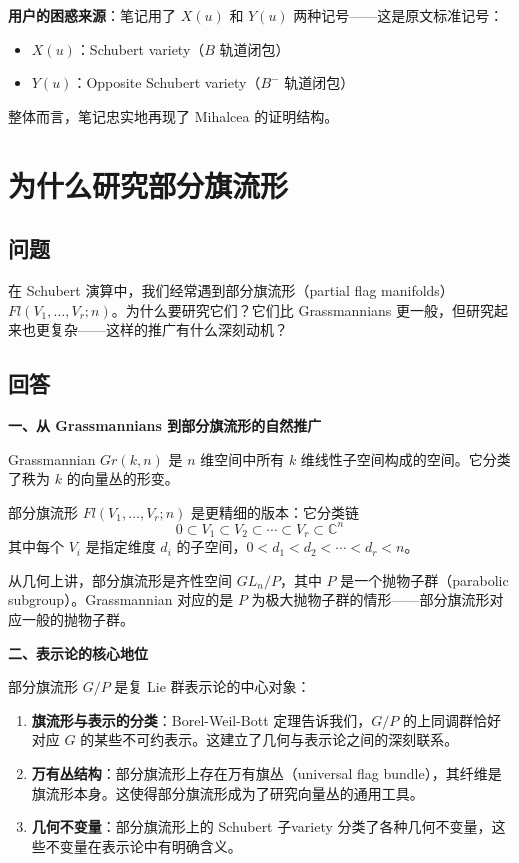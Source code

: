 \textbf{用户的困惑来源}：笔记用了 $X(u)$ 和 $Y(u)$ 两种记号——这是原文标准记号：
\begin{itemize}
\item $X(u)$：Schubert variety（$B$ 轨道闭包）
\item $Y(u)$：Opposite Schubert variety（$B^-$ 轨道闭包）
\end{itemize}

整体而言，笔记忠实地再现了 Mihalcea 的证明结构。

\section{为什么研究部分旗流形}\label{sec:qa-partial-flag-manifolds}
\subsection{问题}
在 Schubert 演算中，我们经常遇到部分旗流形（partial flag manifolds）$Fl(V_1, \ldots, V_r; n)$。为什么要研究它们？它们比 Grassmannians 更一般，但研究起来也更复杂——这样的推广有什么深刻动机？

\subsection{回答}
\textbf{一、从 Grassmannians 到部分旗流形的自然推广}

Grassmannian $Gr(k, n)$ 是 $n$ 维空间中所有 $k$ 维线性子空间构成的空间。它分类了秩为 $k$ 的向量丛的形变。

部分旗流形 $Fl(V_1, \ldots, V_r; n)$ 是更精细的版本：它分类链
$$0 \subset V_1 \subset V_2 \subset \cdots \subset V_r \subset \mathbb{C}^n$$
其中每个 $V_i$ 是指定维度 $d_i$ 的子空间，$0 < d_1 < d_2 < \cdots < d_r < n$。

从几何上讲，部分旗流形是齐性空间 $GL_n / P$，其中 $P$ 是一个抛物子群（parabolic subgroup）。Grassmannian 对应的是 $P$ 为极大抛物子群的情形——部分旗流形对应一般的抛物子群。

\textbf{二、表示论的核心地位}

部分旗流形 $G/P$ 是复 Lie 群表示论的中心对象：

\begin{enumerate}
\item \textbf{旗流形与表示的分类}：Borel-Weil-Bott 定理告诉我们，$G/P$ 的上同调群恰好对应 $G$ 的某些不可约表示。这建立了几何与表示论之间的深刻联系。

\item \textbf{万有丛结构}：部分旗流形上存在万有旗丛（universal flag bundle），其纤维是旗流形本身。这使得部分旗流形成为了研究向量丛的通用工具。

\item \textbf{几何不变量}：部分旗流形上的 Schubert 子variety 分类了各种几何不变量，这些不变量在表示论中有明确含义。
\end{enumerate}


